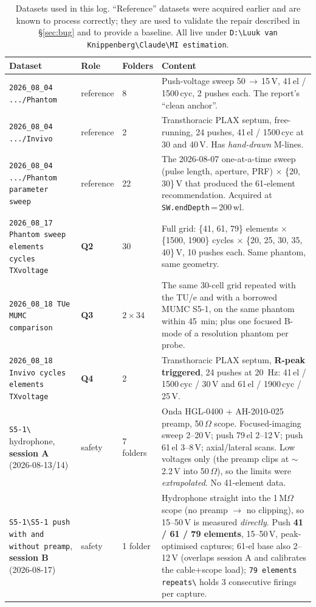 \documentclass[11pt,a4paper]{article}
\begin{document}
\begin{table}[h]
\centering\small
\caption{Datasets used in this log. ``Reference'' datasets were acquired earlier and are known to
process correctly; they are used to validate the repair described in \S\ref{sec:bug} and to
provide a baseline. All live under
\texttt{D:\textbackslash Luuk van Knippenberg\textbackslash Claude\textbackslash MI estimation}.}
\label{tab:data}
\begin{tabular}{@{}p{4.6cm}p{2.0cm}p{2.2cm}p{6.2cm}@{}}
\toprule
\textbf{Dataset} & \textbf{Role} & \textbf{Folders} & \textbf{Content} \\
\midrule
\texttt{2026\_08\_04 .../Phantom} & reference & 8 & Push-voltage sweep 50\,$\rightarrow$\,15\,V,
41\,el / 1500\,cyc, 2 pushes each. The report's ``clean anchor''. \\
\texttt{2026\_08\_04 .../Invivo} & reference & 2 & Transthoracic PLAX septum, free-running,
24 pushes, 41\,el / 1500\,cyc at 30 and 40\,V. Has \emph{hand-drawn} M-lines. \\
\texttt{2026\_08\_04 .../Phantom parameter sweep} & reference & 22 & The 2026-08-07 one-at-a-time
sweep (pulse length, aperture, PRF) $\times$ \{20, 30\}\,V that produced the 61-element
recommendation. Acquired at \texttt{SW.endDepth}\,=\,200\,wl. \\
\midrule
\texttt{2026\_08\_17 Phantom sweep elements cycles TXvoltage} & \textbf{Q2} & 30 &
Full grid: \{41, 61, 79\} elements $\times$ \{1500, 1900\} cycles $\times$ \{20, 25, 30, 35, 40\}\,V,
10 pushes each. Same phantom, same geometry. \\
\texttt{2026\_08\_18 TUe MUMC comparison} & \textbf{Q3} & $2\times34$ &
The same 30-cell grid repeated with the TU/e and with a borrowed MUMC S5-1, on the same phantom
within \SI{45}{\minute}; plus one focused B-mode of a resolution phantom per probe. \\
\texttt{2026\_08\_18 Invivo cycles elements TXvoltage} & \textbf{Q4} & 2 &
Transthoracic PLAX septum, \textbf{R-peak triggered}, 24 pushes at \SI{20}{\hertz}:
41\,el / 1500\,cyc / 30\,V and 61\,el / 1900\,cyc / 25\,V. \\
\midrule
\texttt{S5-1\textbackslash} hydrophone, \textbf{session A} (2026-08-13/14) & safety & 7 folders &
Onda HGL-0400 + AH-2010-025 preamp, 50\,$\Omega$ scope. Focused-imaging sweep 2--20\,V; push
79\,el 2--12\,V; push 61\,el 3--8\,V; axial/lateral scans. Low voltages only (the preamp clips at
$\sim$2.2\,V into 50\,$\Omega$), so the limits were \emph{extrapolated}. No 41-element data. \\
\texttt{S5-1\textbackslash S5-1 push with and without preamp}, \textbf{session B} (2026-08-17) &
safety & 1 folder & Hydrophone straight into the 1\,M$\Omega$ scope (no preamp $\rightarrow$ no
clipping), so 15--50\,V is measured \emph{directly}. Push \textbf{41 / 61 / 79 elements},
15--50\,V, peak-optimised captures; 61-el base also 2--12\,V (overlaps session A and calibrates the
cable+scope load); \texttt{79 elements repeats\textbackslash} holds 3 consecutive firings per
capture. \\
\bottomrule
\end{tabular}
\end{table}
\end{document}
